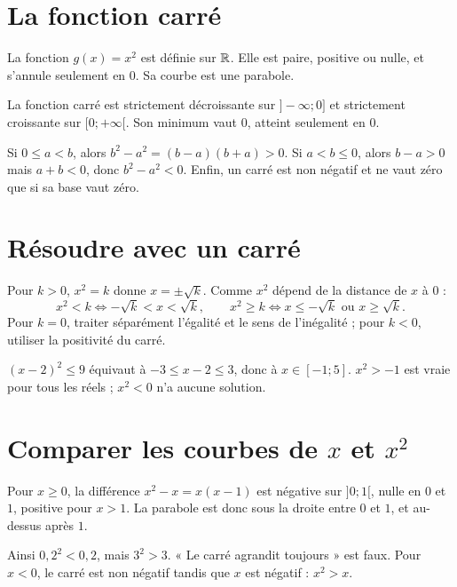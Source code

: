 \documentclass[../cours_2de.tex]{subfiles}
\begin{document}
\section{La fonction carré}
La fonction $g(x)=x^2$ est définie sur $\mathbb{R}$. Elle est paire, positive ou nulle, et s'annule seulement en $0$. Sa courbe est une parabole.
\begin{theoreme}
La fonction carré est strictement décroissante sur $]-\infty;0]$ et strictement croissante sur $[0;+\infty[$. Son minimum vaut $0$, atteint seulement en $0$.
\end{theoreme}
\begin{demonstration}
Si $0\leq a<b$, alors $b^2-a^2=(b-a)(b+a)>0$.
Si $a<b\leq0$, alors $b-a>0$ mais $a+b<0$, donc $b^2-a^2<0$.
Enfin, un carré est non négatif et ne vaut zéro que si sa base vaut zéro.
\end{demonstration}
\begin{center}
\end{center}
\section{Résoudre avec un carré}
Pour $k>0$, $x^2=k$ donne $x=\pm\sqrt k$.
Comme $x^2$ dépend de la distance de $x$ à $0$ :
\[
x^2<k\Leftrightarrow-\sqrt k<x<\sqrt k,\qquad
x^2\geq k\Leftrightarrow x\leq-\sqrt k\text{ ou }x\geq\sqrt k.
\]
Pour $k=0$, traiter séparément l'égalité et le sens de l'inégalité ; pour $k<0$, utiliser la positivité du carré.
\begin{exemple}
$(x-2)^2\leq9$ équivaut à $-3\leq x-2\leq3$, donc à $x\in[-1;5]$.
$x^2>-1$ est vraie pour tous les réels ; $x^2<0$ n'a aucune solution.
\end{exemple}
\section{Comparer les courbes de $x$ et $x^2$}
\begin{demonstration}
Pour $x\geq0$, la différence $x^2-x=x(x-1)$ est négative sur $]0;1[$, nulle en $0$ et $1$, positive pour $x>1$.
La parabole est donc sous la droite entre $0$ et $1$, et au-dessus après $1$.
\end{demonstration}
Ainsi $0{,}2^2<0{,}2$, mais $3^2>3$. « Le carré agrandit toujours » est faux.
Pour $x<0$, le carré est non négatif tandis que $x$ est négatif : $x^2>x$.
\end{document}
